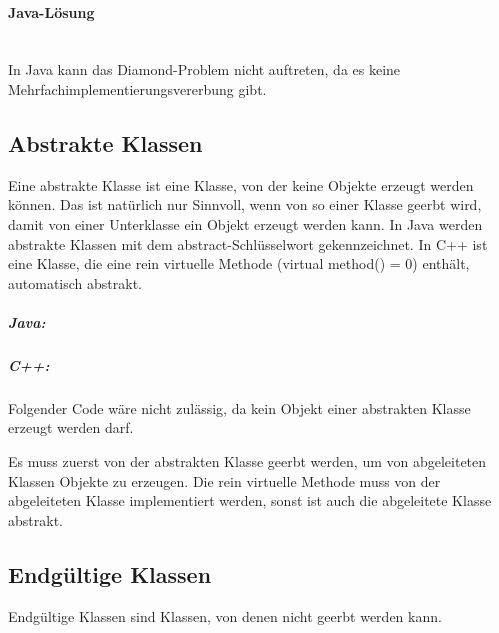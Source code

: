 			\paragraph{Java-Lösung}\mbox{}\\
				In Java kann das Diamond-Problem nicht auftreten, da es keine Mehrfachimplementierungsvererbung gibt.
			
	\subsection{Abstrakte Klassen}
		Eine abstrakte Klasse ist eine Klasse, von der keine Objekte erzeugt werden können. Das ist natürlich nur Sinnvoll,
		wenn von so einer Klasse geerbt wird, damit von einer Unterklasse ein Objekt erzeugt werden kann. In Java werden
		abstrakte Klassen mit dem abstract-Schlüsselwort gekennzeichnet. In C++ ist eine Klasse, die eine rein virtuelle
		Methode (virtual method() = 0) enthält, automatisch abstrakt.
		
		\subparagraph*{Java:}
			\UseRawInputEncoding{}
		
		\subparagraph*{C++:}
			\UseRawInputEncoding{}
			
			Folgender Code wäre nicht zulässig, da kein Objekt einer abstrakten Klasse erzeugt werden darf.
			\UseRawInputEncoding{}
			
			Es muss zuerst von der abstrakten Klasse geerbt werden, um von abgeleiteten Klassen Objekte zu erzeugen. Die rein
			virtuelle Methode muss von der abgeleiteten Klasse implementiert werden, sonst ist auch die abgeleitete Klasse
			abstrakt.
			\UseRawInputEncoding{}
	
	\subsection{Endgültige Klassen}
		Endgültige Klassen sind Klassen, von denen nicht geerbt werden kann.
		\UseRawInputEncoding{}

